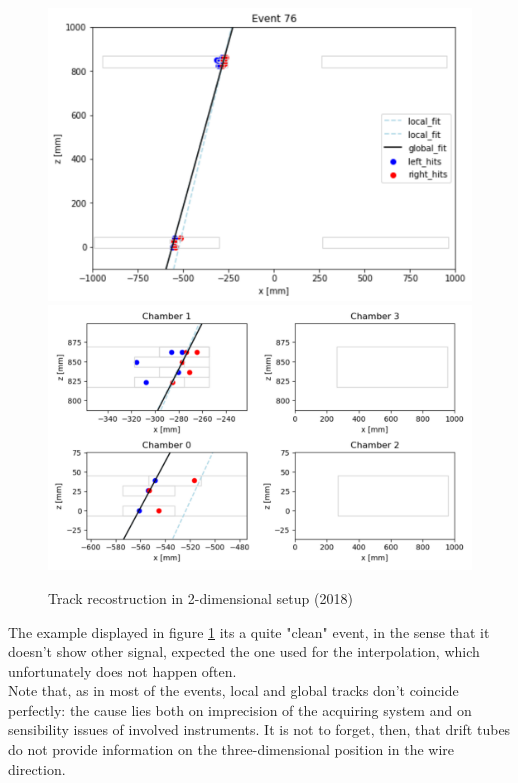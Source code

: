 \documentclass[a4paper,11pt]{book}
\begin{document}
\begin{figure}[hbtp]
\centering
\includegraphics[scale=0.4]{pictures/2D_example_global.pdf}\hfill
\includegraphics[scale=0.4]{pictures/2D_example_chambers.pdf}
\caption{Track recostruction in 2-dimensional setup (2018)}
\label{fig:example_track_2018}
\end{figure}

The example displayed in figure \ref{fig:example_track_2018} its a quite "clean" event, in the sense that it doesn't show other signal, expected the one used for the interpolation, which unfortunately does not happen often.\\
Note that, as in most of the events, local and global tracks don't coincide perfectly: the cause lies both on imprecision of the acquiring system and on sensibility issues of involved instruments. It is not to forget, then, that drift tubes do not provide information on the three-dimensional position in the wire direction.\\
\end{document}
